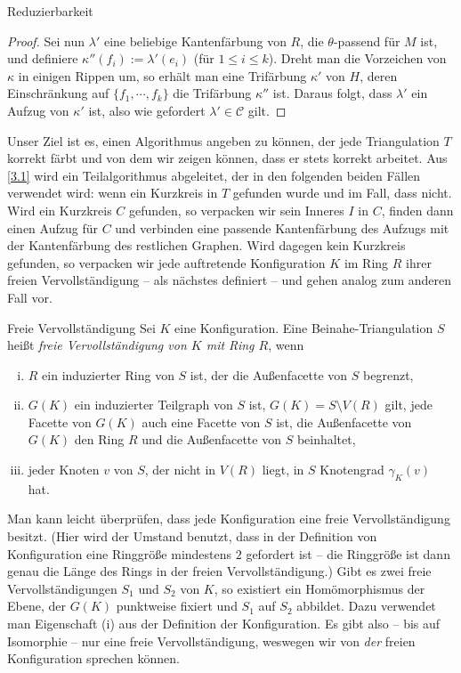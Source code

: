 \begin{section}{Reduzierbarkeit}
\begin{proof}
  Sei nun $\lambda'$ eine beliebige Kantenfärbung von $R$, die $\theta$-passend für $M$ ist, und definiere $\kappa''(f_i) := \lambda'(e_i)$ (für $1\leq i \leq k$). Dreht man die Vorzeichen von $\kappa$ in einigen Rippen um, so erhält man eine Trifärbung $\kappa'$ von $H$, deren Einschränkung auf $\{f_1,\cdots,f_k\}$ die Trifärbung $\kappa''$ ist. Daraus folgt, dass $\lambda'$ ein Aufzug von $\kappa'$ ist, also wie gefordert $\lambda' \in \mathscr{C}$ gilt. 
 \end{proof}
 
 Unser Ziel ist es, einen Algorithmus angeben zu können, der jede Triangulation $T$ korrekt färbt und von dem wir zeigen können, dass er stets korrekt arbeitet. Aus \ref{3.1} wird ein Teilalgorithmus abgeleitet, der in den folgenden beiden Fällen verwendet wird: wenn ein Kurzkreis in $T$ gefunden wurde und im Fall, dass nicht. Wird ein Kurzkreis $C$ gefunden, so verpacken wir sein Inneres $I$ in $C$, finden dann einen Aufzug für $C$ und verbinden eine passende Kantenfärbung des Aufzugs mit der Kantenfärbung des restlichen Graphen. Wird dagegen kein Kurzkreis gefunden, so verpacken wir jede auftretende Konfiguration $K$ im Ring $R$ ihrer freien Vervollständigung -- als nächstes definiert -- und gehen analog zum anderen Fall vor. 

\begin{definition}{Freie Vervollständigung}
  Sei $K$ eine Konfiguration. Eine Beinahe-Triangulation $S$ heißt \textit{freie Vervollständigung von $K$ mit Ring $R$}, wenn
  \begin{enumerate}[(i)]
   \item $R$ ein induzierter Ring von $S$ ist, der die Außenfacette von $S$ begrenzt,
   \item $G(K)$ ein induzierter Teilgraph von $S$ ist, $G(K) = S \setminus V(R)$ gilt, jede Facette von $G(K)$ auch eine Facette von $S$ ist, die Außenfacette von $G(K)$ den Ring $R$ und die Außenfacette von $S$ beinhaltet,
   \item jeder Knoten $v$ von $S$, der nicht in $V(R)$ liegt, in $S$ Knotengrad $\gamma_K(v)$ hat.
  \end{enumerate}
 \end{definition}
 
 Man kann leicht überprüfen, dass jede Konfiguration eine freie Vervollständigung besitzt. (Hier wird der Umstand benutzt, dass in der Definition von Konfiguration eine Ringgröße mindestens $2$ gefordert ist -- die Ringgröße ist dann genau die Länge des Rings in der freien Vervollständigung.) Gibt es zwei freie Vervollständigungen $S_1$ und $S_2$ von $K$, so existiert ein Homömorphismus der Ebene, der $G(K)$ punktweise fixiert und $S_1$ auf $S_2$ abbildet. Dazu verwendet man Eigenschaft (i) aus der Definition der Konfiguration. Es gibt also -- bis auf Isomorphie -- nur eine freie Vervollständigung, weswegen wir von \textit{der} freien Konfiguration sprechen können.
 

\end{section}
